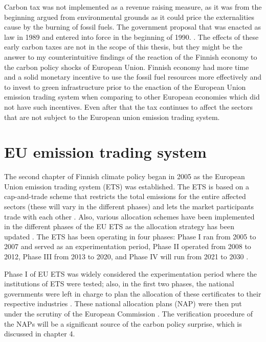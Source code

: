 \documentclass[
  12pt,
  a4paper,
]{report}
\begin{document}
Carbon tax was not implemented as a revenue raising measure, as it was from the beginning argued from environmental grounds as it could price the externalities cause by the burning of fossil fuels. The government proposal that was enacted as law in 1989 and entered into force in the beginning of 1990. \citep{hallitus1989}. The effects of these early carbon taxes are not in the scope of this thesis, but they might be the answer to my counterintuitive findings of the reaction of the Finnish economy to the carbon policy shocks of European Union. Finnish economy had more time and a solid monetary incentive to use the fossil fuel resources more effectively and to invest to green infrastructure prior to the enaction of the European Union emission trading system when comparing to other European economies which did not have such incentives. Even after that the tax continues to affect the sectors that are not subject to the European union emission trading system.

\hypertarget{eu-emission-trading-system}{%
\section{EU emission trading system}\label{eu-emission-trading-system}}

The second chapter of Finnish climate policy began in 2005 as the European Union emission trading system (ETS) was established. The ETS is based on a cap-and-trade scheme that restricts the total emissions for the entire affected sectors (these will vary in the different phases) and lets the market participants trade with each other \citep{garcia2021}. Also, various allocation schemes have been implemented in the different phases of the EU ETS as the allocation strategy has been updated \citep{verde2019free}. The ETS has been operating in four phases: Phase I ran from 2005 to 2007 and served as an experimentation period, Phase II operated from 2008 to 2012, Phase III from 2013 to 2020, and Phase IV will run from 2021 to 2030 \citep{ellerman2020,joltreau2019,verde2019free}.

Phase I of EU ETS was widely considered the experimentation period where the institutions of ETS were tested; also, in the first two phases, the national governments were left in charge to plan the allocation of these certificates to their respective industries \citep{verde2019free}. These national allocation plans (NAP) were then put under the scrutiny of the European Commission \citep{ellerman2020}. The verification procedure of the NAPs will be a significant source of the carbon policy surprise, which is discussed in chapter 4.
\end{document}
